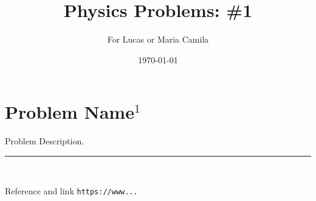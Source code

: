\documentclass{article}
\begin{document}
\title{Physics Problems: \#1}

\author{For Lucas or Maria Camila}

\date{\today}
\maketitle


\section*{Problem Name$^1$}

Problem Description.\\


\vspace{2mm}

\begin{center}
\noindent\rule{8cm}{0.4pt}\\
\end{center}

\noindent [1] Reference and link \texttt{https://www...}
\end{document}
